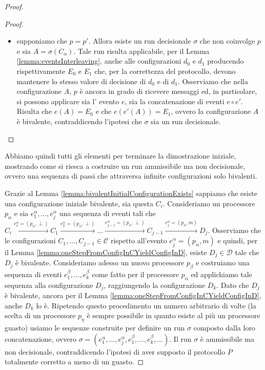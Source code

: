 \documentclass{article}
\begin{document}
\begin{proof}
\begin{proof}
\begin{itemize}
\item supponiamo che $p=p'$. Allora esiste un run decisionale $\sigma$
  che non coinvolge $p$ e sia $A=\sigma(C_{\alpha})$. Tale run risulta
  applicabile, per il Lemma \ref{lemma:eventsInterleaving}, anche alle
  configurazioni $d_0$ e $d_1$ producendo rispettivamente $E_0$ e
  $E_1$ che, per la correttezza del protocollo, devono mantenere lo
  stesso valore di decisione di $d_0$ e di $d_1$. Osserviamo che nella
  configurazione $A$, $p$ è ancora in grado di ricevere messaggi ed,
  in particolare, si possono applicare sia l' evento $e$, sia la
  concatenazione di eventi $e \circ e'$. Risulta che $e(A)=E_0$ e che
  $e(e'(A))=E_1$, ovvero la configurazione $A$ è bivalente,
  contraddicendo l'ipotesi che $\sigma$ sia un run decisionale.
\end{itemize} 
\end{proof}
Abbiamo quindi tutti gli elementi per terminare la dimostrazione
iniziale, mostrando come si riesca a costruire un run ammissibile ma
non decisionale, ovvero una sequenza di passi che attraversa infinite
configurazioni solo bivalenti.

Grazie al Lemma \ref{lemma:bivalentInitialConfigurationExists}
sappiamo che esiste una configurazione iniziale bivalente, sia questa
$C_i$. Consideriamo un processore $p_{\alpha}$ e sia
$e_1^{\alpha},\ldots,e_j^{\alpha}$ una sequenza di eventi tali che
$C_i \xrightarrow{e_1^{\alpha}=(p_{\alpha},\perp)} C_1
\xrightarrow{e_2^{\alpha}=(p_{\alpha},\perp)} \ldots
\xrightarrow{e_{j-1}^{\alpha}=(p_{\alpha},\perp)} C_{j-1}
\xrightarrow{e_j^{\alpha}=(p_{\alpha},m)} D_{j}$. Osserviamo che le
configurazioni $C_1, \ldots, C_{j-1} \in \mathcal{C}$ rispetto
all'evento $e_j^{\alpha}=(p_{\alpha},m)$ e quindi, per il Lemma
\ref{lemma:oneStepFromConfigInCYieldConfigInD}, esiste $D_j \in
\mathcal{D}$ tale che $D_j$ \`e bivalente. Consideriamo adesso un
nuovo processore $p_{\beta}$ e costruiamo una sequenza di eventi
$e_1^{\beta},\ldots,e_k^{\beta}$ come fatto per il processore
$p_{\alpha}$ ed applichiamo tale sequenza alla configurazione $D_j$,
raggiungendo la configurazione $D_k$. Dato che $D_j$ \`e bivalente,
ancora per il Lemma \ref{lemma:oneStepFromConfigInCYieldConfigInD},
anche $D_k$ lo \`e. Ripetendo questo procedimento un numero arbitrario
di volte (la scelta di un processore $p_{\eta}$ \`e sempre possibile
in quanto esiste al pi\`u un processore guasto) usiamo le sequenze
construite per definire un run $\sigma$ composto dalla loro
concatenazione, ovvero $\sigma =
(e_1^{\alpha},\ldots,e_j^{\alpha},e_1^{\beta},\ldots,e_k^{\beta},\ldots)$. Il
run $\sigma$ \`e ammissibile ma non decisionale, contraddicendo
l'ipotesi di aver supposto il protocollo $P$ totalmente corretto a
meno di un guasto.
\end{proof}
\end{document}
